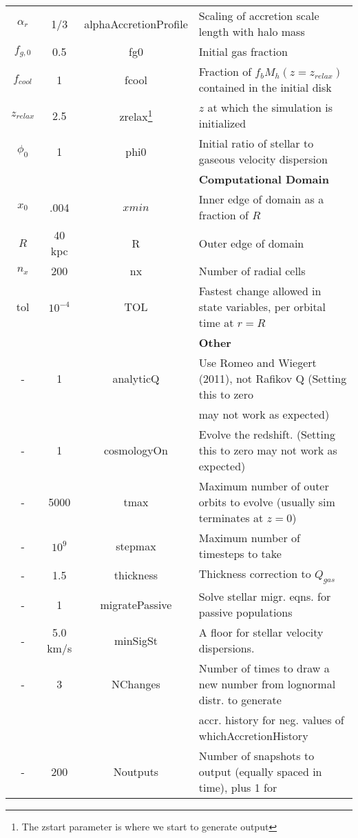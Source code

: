 \documentclass[11pt]{amsart}
\begin{document}
\begin{table}
{\begin{tabular}{cccl}
        $\alpha_r$ & 1/3 & alphaAccretionProfile & Scaling of accretion scale length with halo mass \\
        $f_{g,0}$ & 0.5 &  fg0 &Initial gas fraction  \\
        $f_{cool}$ & 1 & fcool & Fraction of $f_b M_h(z=z_{relax})$ contained in the initial disk\\
        $z_{relax}$ & 2.5 & zrelax\footnote{The zstart parameter is where we start to generate output} & $z$ at which the simulation is initialized\\
        $\phi_0$ & 1 & phi0 & Initial ratio of stellar to gaseous velocity dispersion\\ \hline
        & & & {\bf Computational Domain}  \\
        $x_0$ & .004 & $ xmin$ & Inner edge of domain as a fraction of $R$ \\
        $R$ & 40 kpc & R & Outer edge of domain \\
        $n_x$ & 200 & nx & Number of radial cells \\
        tol & $10^{-4}$ & TOL & Fastest change allowed in state variables, per orbital time at $r=R$\\ \hline
        & & & {\bf Other} \\ 
        - & 1 & analyticQ & Use Romeo and Wiegert (2011), not Rafikov Q (Setting this to zero \\
        & & & may not work as expected)\\
        - & 1 & cosmologyOn & Evolve the redshift. (Setting this to zero may not work as expected) \\
        - & 5000 & tmax & Maximum number of outer orbits to evolve (usually sim terminates at $z=0$) \\
        - & $10^9$ & stepmax & Maximum number of timesteps to take\\
        - & 1.5 & thickness & Thickness correction to $Q_{gas}$ \\
        - & 1 & migratePassive & Solve stellar migr. eqns. for passive populations \\
        - & 5.0 km/s& minSigSt & A floor for stellar velocity dispersions. \\
        - & 3 & NChanges & Number of times to draw a new number from lognormal distr. to generate \\
        & & & accr. history for neg. values of whichAccretionHistory \\ 
        - & 200 & Noutputs & Number of snapshots to output (equally spaced in time), plus 1 for \\ 

\end{tabular}}
\end{table}
\end{document}
